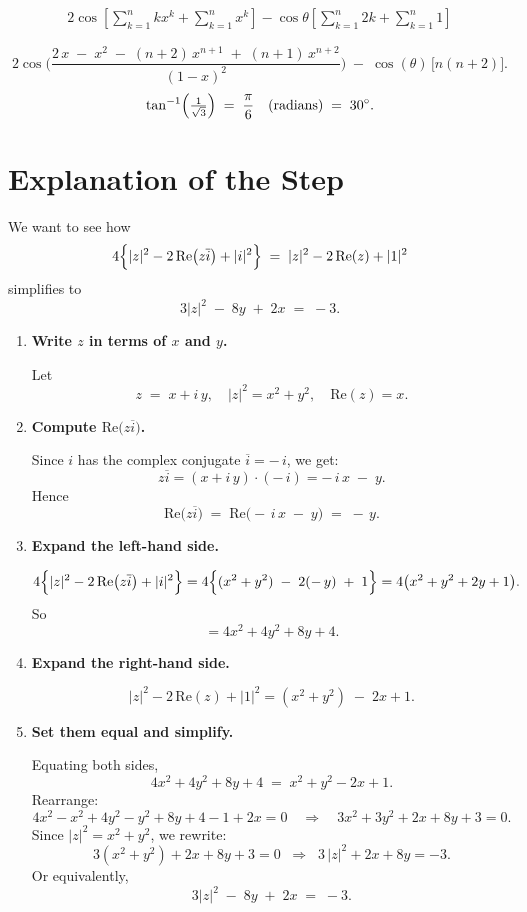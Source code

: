 \documentclass[12pt]{article}
\title{}
\author{Jerich Lee}
\date{\today}
\theoremstyle{definition} %
\theoremstyle{plain} %
\begin{document}
\maketitle
\begin{align}
    2\cos\left[ \sum_{k=1}^{n} kx^{k} +\sum_{k=1}^{n} x^{k} \right] - \cos\theta \left[ \sum_{k=1}^{n} 2k+\sum_{k=1}^{n} 1 \right]  
\end{align}

    \[
\boxed{
2 \cos\!\biggl(
\frac{2\,x \;-\; x^2 \;-\; (n+2)\,x^{n+1} \;+\; (n+1)\,x^{n+2}}
{(1-x)^2}
\biggr)
\;-\;
\cos(\theta)\,\bigl[n(n+2)\bigr].
}
\]
\[
\tan^{-1}\Bigl(\tfrac{1}{\sqrt{3}}\Bigr) \;=\; \frac{\pi}{6}\quad\text{(radians)} \;=\; 30^\circ.
\]

\section*{Explanation of the Step}

We want to see how
\[
4\Bigl\{\lvert z\rvert^2 - 2\,\mathrm{Re}\bigl(z\overline{i}\bigr) + \lvert i\rvert^2 \Bigr\}
\;=\;
\lvert z\rvert^2 - 2\,\mathrm{Re}(z) + \lvert 1\rvert^2
\]
simplifies to
\[
3 \lvert z\rvert^2 \;-\; 8y \;+\; 2x \;=\;-3.
\]

\begin{enumerate}
\item \textbf{Write $z$ in terms of $x$ and $y$.}

Let
\[
z \;=\; x + i\,y, 
\quad 
\lvert z\rvert^2 = x^2 + y^2,
\quad
\mathrm{Re}(z) = x.
\]

\item \textbf{Compute $\mathrm{Re}\bigl(z\overline{i}\bigr)$.}

Since $i$ has the complex conjugate $\overline{i} = -\,i$, we get:
\[
z\overline{i} = (x + i\,y)\cdot(-\,i) = -\,i\,x \;-\; y.
\]
Hence
\[
\mathrm{Re}\bigl(z\overline{i}\bigr) \;=\; \mathrm{Re}\bigl(-\,i\,x \;-\; y \bigr)
\;=\;
-\,y.
\]

\item \textbf{Expand the left-hand side.}

\[
4\Bigl\{\lvert z\rvert^2 - 2\,\mathrm{Re}\bigl(z\overline{i}\bigr) + \lvert i\rvert^2\Bigr\}
=
4\Bigl\{(x^2 + y^2) \;-\; 2(-\,y) \;+\; 1 \Bigr\}
=
4\bigl(x^2 + y^2 + 2y + 1\bigr).
\]
So
\[
= 4x^2 + 4y^2 + 8y + 4.
\]

\item \textbf{Expand the right-hand side.}

\[
\lvert z\rvert^2 - 2\,\mathrm{Re}(z) + \lvert 1\rvert^2
=
(x^2 + y^2) \;-\; 2x + 1.
\]

\item \textbf{Set them equal and simplify.}

Equating both sides,
\[
4x^2 + 4y^2 + 8y + 4
\;=\;
x^2 + y^2 - 2x + 1.
\]
Rearrange:
\[
4x^2 - x^2 + 4y^2 - y^2 + 8y + 4 - 1 + 2x 
= 0
\quad\Longrightarrow\quad
3x^2 + 3y^2 + 2x + 8y + 3 = 0.
\]
Since $\lvert z\rvert^2 = x^2 + y^2$, we rewrite:
\[
3(x^2 + y^2) + 2x + 8y + 3 = 0
\;\;\Longrightarrow\;\;
3\,\lvert z\rvert^2 + 2x + 8y = -3.
\]
Or equivalently,
\[
3 \lvert z\rvert^2 \;-\; 8y \;+\; 2x 
\;=\;
-3.
\]

\end{enumerate}
\end{document}
